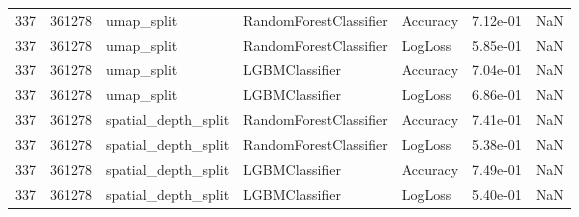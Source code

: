 \begin{tabular}{rrlllrr}
337 & 361278 & umap\_split & RandomForestClassifier & Accuracy & 7.12e-01 & NaN \\
337 & 361278 & umap\_split & RandomForestClassifier & LogLoss & 5.85e-01 & NaN \\
337 & 361278 & umap\_split & LGBMClassifier & Accuracy & 7.04e-01 & NaN \\
337 & 361278 & umap\_split & LGBMClassifier & LogLoss & 6.86e-01 & NaN \\
337 & 361278 & spatial\_depth\_split & RandomForestClassifier & Accuracy & 7.41e-01 & NaN \\
337 & 361278 & spatial\_depth\_split & RandomForestClassifier & LogLoss & 5.38e-01 & NaN \\
337 & 361278 & spatial\_depth\_split & LGBMClassifier & Accuracy & 7.49e-01 & NaN \\
337 & 361278 & spatial\_depth\_split & LGBMClassifier & LogLoss & 5.40e-01 & NaN \\
\bottomrule
\end{tabular}
